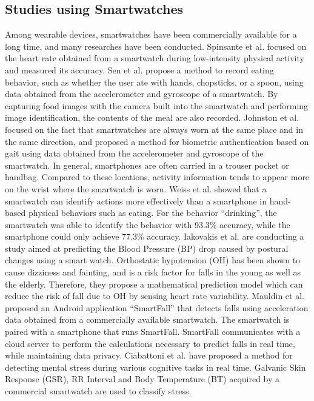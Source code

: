 \documentclass[sigchi,authordraft]{acmart}
\begin{document}
\subsection{Studies using Smartwatches}
Among wearable devices, smartwatches have been commercially available for a long time, and many researches have been conducted.
Spinsante et al.\cite{accuracy_in_low_intensity} focused on the heart rate obtained from a smartwatch during low-intensity physical activity and measured its accuracy.
Sen et al.\cite{eating_recognition} propose a method to record eating behavior, such as whether the user ate with hands, chopsticks, or a spoon, using data obtained from the accelerometer and gyroscope of a smartwatch. By capturing food images with the camera built into the smartwatch and performing image identification, the contents of the meal are also recorded.
Johnston et al.\cite{smartwatch_walk_authentication} focused on the fact that smartwatches are always worn at the same place and in the same direction, and proposed a method for biometric authentication based on gait using data obtained from the accelerometer and gyroscope of the smartwatch. In general, smartphones are often carried in a trouser pocket or handbag. Compared to these locations, activity information tends to appear more on the wrist where the smartwatch is worn.
Weiss et al.\cite{smartwatch_activity_recognition} showed that a smartwatch can identify actions more effectively than a smartphone in hand-based physical behaviors such as eating. For the behavior ``drinking'', the smartwatch was able to identify the behavior with 93.3\% accuracy, while the smartphone could only achieve 77.3\% accuracy.
Iakovakis et al.\cite{oh_detection} are conducting a study aimed at predicting the Blood Pressure (BP) drop caused by postural changes using a smart watch. Orthostatic hypotension (OH) has been shown to cause dizziness and fainting, and is a risk factor for falls in the young as well as the elderly. Therefore, they propose a mathematical prediction model which can reduce the risk of fall due to OH by sensing heart rate variability.
Mauldin et al.\cite{smartfall} proposed an Android application ``SmartFall'' that detects falls using acceleration data obtained from a commercially available smartwatch. The smartwatch is paired with a smartphone that runs SmartFall. SmartFall communicates with a cloud server to perform the calculations necessary to predict falls in real time, while maintaining data privacy.
Ciabattoni et al.\cite{smartwatch_stress_detection} have proposed a method for detecting mental stress during various cognitive tasks in real time. Galvanic Skin Response (GSR), RR Interval and Body Temperature (BT) acquired by a commercial smartwatch are used to classify stress.\par
\end{document}
